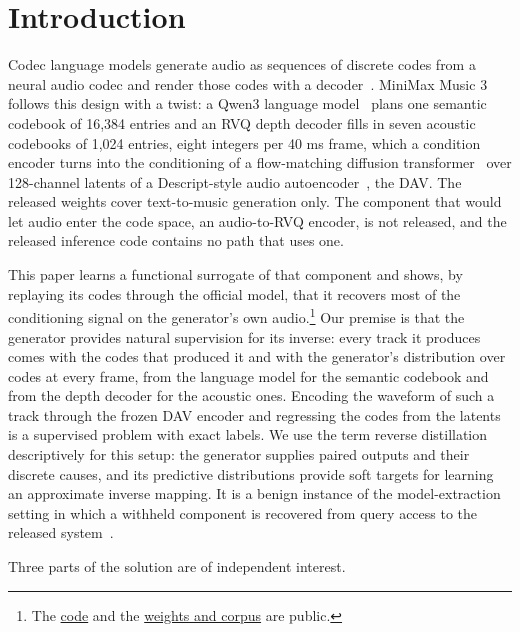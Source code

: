 \section{Introduction}

Codec language models generate audio as sequences of discrete codes from a neural audio codec and render those codes with a decoder~\cite{borsos2023audiolm,wang2023valle,copet2023musicgen}. MiniMax Music 3~\cite{minimax2026music3} follows this design with a twist: a Qwen3 language model~\cite{qwen3} plans one semantic codebook of 16,384 entries and an RVQ depth decoder fills in seven acoustic codebooks of 1,024 entries, eight integers per 40 ms frame, which a condition encoder turns into the conditioning of a flow-matching diffusion transformer~\cite{lipman2023flow,peebles2023dit} over 128-channel latents of a Descript-style audio autoencoder~\cite{kumar2023dac}, the DAV. The released weights cover text-to-music generation only. The component that would let audio enter the code space, an audio-to-RVQ encoder, is not released, and the released inference code contains no path that uses one.

This paper learns a functional surrogate of that component and shows, by replaying its codes through the official model, that it recovers most of the conditioning signal on the generator's own audio.\footnote{The \href{https://github.com/MunazaAshraf10/open-rvq-encoder-minimax-music3}{code} and the \href{https://huggingface.co/SimpleTuner/open-rvq-encoder-minimax-music3}{weights and corpus} are public.} Our premise is that the generator provides natural supervision for its inverse: every track it produces comes with the codes that produced it and with the generator's distribution over codes at every frame, from the language model for the semantic codebook and from the depth decoder for the acoustic ones. Encoding the waveform of such a track through the frozen DAV encoder and regressing the codes from the latents is a supervised problem with exact labels. We use the term reverse distillation descriptively for this setup: the generator supplies paired outputs and their discrete causes, and its predictive distributions provide soft targets for learning an approximate inverse mapping. It is a benign instance of the model-extraction setting in which a withheld component is recovered from query access to the released system~\cite{tramer2016stealing,carlini2024stealing}.

Three parts of the solution are of independent interest.


